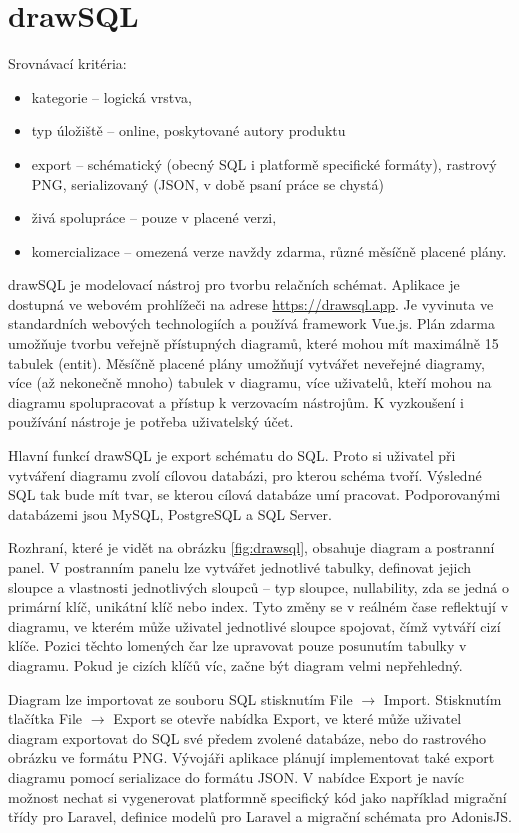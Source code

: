 \section{drawSQL}

Srovnávací kritéria:
\begin{itemize}
  \item kategorie -- logická vrstva,
  \item typ úložiště -- online, poskytované autory produktu
  \item export -- schématický (obecný SQL i platformě specifické formáty),
  rastrový PNG, serializovaný (JSON, v době psaní práce se chystá)
  \item živá spolupráce -- pouze v placené verzi,
  \item komercializace -- omezená verze navždy zdarma, různé měsíčně placené
  plány.
\end{itemize}

drawSQL je modelovací nástroj pro tvorbu relačních schémat. Aplikace je dostupná
ve webovém prohlížeči na adrese \url{https://drawsql.app}. Je vyvinuta ve
standardních webových technologiích a používá framework Vue.js. Plán zdarma
umožňuje tvorbu veřejně přístupných diagramů, které mohou mít maximálně 15
tabulek (entit). Měsíčně placené plány umožňují vytvářet neveřejné diagramy,
více (až nekonečně mnoho) tabulek v diagramu, více uživatelů, kteří mohou na
diagramu spolupracovat a přístup k verzovacím nástrojům. K vyzkoušení i
používání nástroje je potřeba uživatelský účet.

Hlavní funkcí drawSQL je export schématu do SQL. Proto si uživatel při vytváření
diagramu zvolí cílovou databázi, pro kterou schéma tvoří. Výsledné SQL tak bude
mít tvar, se kterou cílová databáze umí pracovat. Podporovanými databázemi jsou
MySQL, PostgreSQL a SQL Server.

Rozhraní, které je vidět na obrázku \ref{fig:drawsql}, obsahuje diagram a
postranní panel. V postranním panelu lze vytvářet jednotlivé tabulky, definovat
jejich sloupce a vlastnosti jednotlivých sloupců -- typ sloupce, nullability,
zda se jedná o primární klíč, unikátní klíč nebo index. Tyto změny se v reálném
čase reflektují v diagramu, ve kterém může uživatel jednotlivé sloupce spojovat,
čímž vytváří cizí klíče. Pozici těchto lomených čar lze upravovat pouze
posunutím tabulky v diagramu. Pokud je cizích klíčů víc, začne být diagram velmi
nepřehledný.

Diagram lze importovat ze souboru SQL stisknutím File $\rightarrow$ Import.
Stisknutím tlačítka File $\rightarrow$ Export se otevře nabídka Export, ve které
může uživatel diagram exportovat do SQL své předem zvolené databáze, nebo do
rastrového obrázku ve formátu PNG. Vývojáři aplikace plánují implementovat také
export diagramu pomocí serializace do formátu JSON. V nabídce Export je navíc
možnost nechat si vygenerovat platformně specifický kód jako například migrační
třídy pro Laravel, definice modelů pro Laravel a migrační schémata pro AdonisJS.

